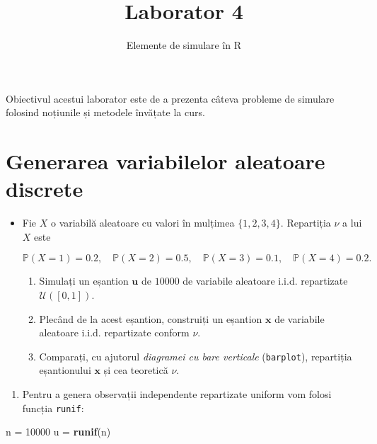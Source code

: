 \documentclass[]{article}
\title{Laborator 4}
\subtitle{Elemente de simulare în R}
\author{}
\date{}
\newenvironment{Shaded}{\begin{snugshade}}{\end{snugshade}}
\newcommand{\DecValTok}[1]{\textcolor[rgb]{0.00,0.00,0.81}{#1}}
\newcommand{\KeywordTok}[1]{\textcolor[rgb]{0.13,0.29,0.53}{\textbf{#1}}}
\newcommand{\NormalTok}[1]{#1}
\newcommand{\StringTok}[1]{\textcolor[rgb]{0.31,0.60,0.02}{#1}}
\providecommand{\tightlist}{%
  \setlength{\itemsep}{0pt}\setlength{\parskip}{0pt}}
\newenvironment{frshaded*}{%
  \def\FrameCommand{\fboxrule=\FrameRule\fboxsep=\FrameSep \fcolorbox{framecolor}{shadecolor1}}%
  \MakeFramed {\advance\hsize-\width \FrameRestore}}%
{\endMakeFramed}
\newenvironment{rmdblock}[1]
  {\begin{frshaded*}
  \begin{itemize}
  \renewcommand{\labelitemi}{
    \raisebox{-.7\height}[0pt][0pt]{
      {\setkeys{Gin}{width=2em,keepaspectratio}\texttt{[image: images/icons/\#1]}}
    }
  }
  \item
  }
  {
  \end{itemize}
  \end{frshaded*}
  }
\newenvironment{rmdexercise}
  {\begin{rmdblock}{exercise}}
  {\end{rmdblock}}
\begin{document}
\maketitle

\thispagestyle{fancy}

Obiectivul acestui laborator este de a prezenta câteva probleme de
simulare folosind noțiunile și metodele învățate la curs.

\hypertarget{generarea-variabilelor-aleatoare-discrete}{%
\section{Generarea variabilelor aleatoare
discrete}\label{generarea-variabilelor-aleatoare-discrete}}

\begin{rmdexercise}
Fie \(X\) o variabilă aleatoare cu valori în mulțimea \(\{1,2,3,4\}\).
Repartiția \(\nu\) a lui \(X\) este

\[
  \mathbb{P}(X = 1) = 0.2, \quad \mathbb{P}(X = 2) = 0.5, \quad \mathbb{P}(X = 3) = 0.1,  \quad \mathbb{P}(X = 4) = 0.2. 
\]

\begin{enumerate}
\def\labelenumi{\arabic{enumi}.}
\item
  Simulați un eșantion \(\boldsymbol u\) de \(10000\) de variabile
  aleatoare i.i.d. repartizate \(\mathcal{U}([0,1])\).
\item
  Plecând de la acest eșantion, construiți un eșantion \(\boldsymbol x\)
  de variabile aleatoare i.i.d. repartizate conform \(\nu\).
\item
  Comparați, cu ajutorul \emph{diagramei cu bare verticale}
  (\texttt{barplot}), repartiția eșantionului \(\boldsymbol x\) și cea
  teoretică \(\nu\).
\end{enumerate}
\end{rmdexercise}

\begin{enumerate}
\def\labelenumi{\arabic{enumi}.}
\tightlist
\item
  Pentru a genera observații independente repartizate uniform vom folosi
  funcția \texttt{runif}:
\end{enumerate}

\begin{Shaded}
\begin{Highlighting}[]
\NormalTok{n =}\StringTok{  }\DecValTok{10000}
\NormalTok{u =}\StringTok{ }\KeywordTok{runif}\NormalTok{(n)}
\end{Highlighting}
\end{Shaded}
\end{document}
